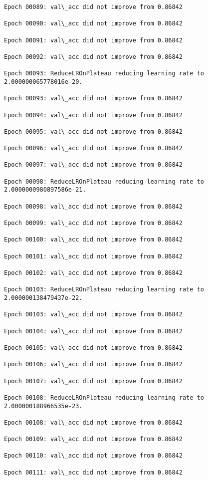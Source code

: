 \documentclass[11pt]{article}
\begin{document}
\begin{Verbatim}[commandchars=\\\{\}]
Epoch 00089: val\_acc did not improve from 0.86842

Epoch 00090: val\_acc did not improve from 0.86842

Epoch 00091: val\_acc did not improve from 0.86842

Epoch 00092: val\_acc did not improve from 0.86842

Epoch 00093: ReduceLROnPlateau reducing learning rate to 2.000000065778016e-20.

Epoch 00093: val\_acc did not improve from 0.86842

Epoch 00094: val\_acc did not improve from 0.86842

Epoch 00095: val\_acc did not improve from 0.86842

Epoch 00096: val\_acc did not improve from 0.86842

Epoch 00097: val\_acc did not improve from 0.86842

Epoch 00098: ReduceLROnPlateau reducing learning rate to 2.0000000980897586e-21.

Epoch 00098: val\_acc did not improve from 0.86842

Epoch 00099: val\_acc did not improve from 0.86842

Epoch 00100: val\_acc did not improve from 0.86842

Epoch 00101: val\_acc did not improve from 0.86842

Epoch 00102: val\_acc did not improve from 0.86842

Epoch 00103: ReduceLROnPlateau reducing learning rate to 2.000000138479437e-22.

Epoch 00103: val\_acc did not improve from 0.86842

Epoch 00104: val\_acc did not improve from 0.86842

Epoch 00105: val\_acc did not improve from 0.86842

Epoch 00106: val\_acc did not improve from 0.86842

Epoch 00107: val\_acc did not improve from 0.86842

Epoch 00108: ReduceLROnPlateau reducing learning rate to 2.000000188966535e-23.

Epoch 00108: val\_acc did not improve from 0.86842

Epoch 00109: val\_acc did not improve from 0.86842

Epoch 00110: val\_acc did not improve from 0.86842

Epoch 00111: val\_acc did not improve from 0.86842


\end{Verbatim}
\end{document}
